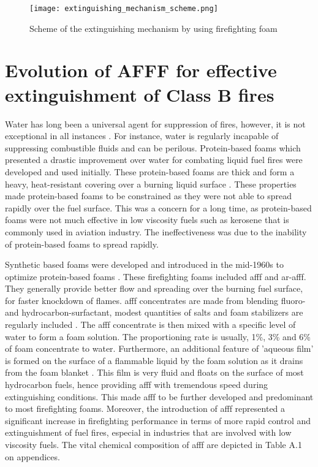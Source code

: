 \begin{figure}[H]
    \centering
    \texttt{[image: extinguishing\_mechanism\_scheme.png]}
    \caption{Scheme of the extinguishing mechanism by using firefighting foam \cite{turekova2011environmental}}
    \label{ch2:figure:scheme}
\end{figure}

\section{Evolution of AFFF for effective extinguishment of Class B fires}
Water has long been a universal agent for suppression of fires, however, it is not exceptional in all instances \cite{hinnant2020characterizing}. For instance, water is regularly incapable of suppressing combustible fluids and can be perilous. Protein-based foams which presented a drastic improvement over water for combating liquid fuel fires were developed and used initially. These protein-based foams are thick and form a heavy, heat-resistant covering over a burning liquid surface \cite{scheffey1995evaluating}. These properties made protein-based foams to be constrained as they were not able to spread rapidly over the fuel surface. This was a concern for a long time, as protein-based foams were not much effective in low viscosity fuels such as kerosene that is commonly used in aviation industry. The ineffectiveness was due to the inability of protein-based foams to spread rapidly.

Synthetic based foams were developed and introduced in the mid-1960s to optimize protein-based foams \cite{aamodt2020review} . These firefighting foams included \acrshort{afff} and \acrshort{ar-afff}. They generally provide better flow and spreading over the burning fuel surface, for faster knockdown of flames. \acrshort{afff} concentrates are made from blending fluoro-and hydrocarbon-surfactant, modest quantities of salts and foam stabilizers are regularly included \cite{wang2019research}. The \acrshort{afff} concentrate is then mixed with a specific level of water to form a foam solution. The proportioning rate is usually, 1\%, 3\% and 6\% of foam concentrate to water. Furthermore, an additional feature of 'aqueous film' is formed on the surface of a flammable liquid by the foam solution as it drains from the foam blanket \cite{hinnant2020characterizing}. This film is very fluid and floats on the surface of most hydrocarbon fuels, hence providing \acrshort{afff} with tremendous speed during extinguishing conditions. This made \acrshort{afff} to be further developed and predominant to most firefighting foams. Moreover, the introduction of \acrshort{afff} represented a significant increase in firefighting performance in terms of more rapid control and extinguishment of fuel fires, especial in industries that are involved with low viscosity fuels. The vital chemical composition of \acrshort{afff} are depicted in Table A.1 on appendices.

